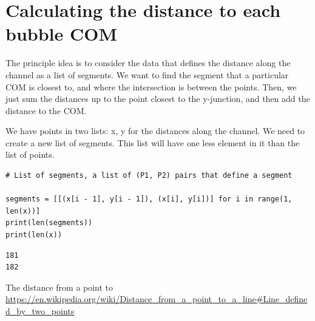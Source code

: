 \documentclass[11pt]{article}
\begin{document}
\section{Calculating the distance to each bubble COM}
\label{sec:orgheadline3}

The principle idea is to consider the data that defines the distance along the channel as a list of segments. We want to find the segment that a particular COM is closest to, and where the intersection is between the points. Then, we just sum the distances up to the point closest to the y-junction, and then add the distance to the COM.

We have points in two lists: x, y for the distances along the channel. We need to create a new list of segments. This list will have one less element in it than the list of points. 

\begin{verbatim}
# List of segments, a list of (P1, P2) pairs that define a segment

segments = [[(x[i - 1], y[i - 1]), (x[i], y[i])] for i in range(1, len(x))]
print(len(segments))
print(len(x))
\end{verbatim}

\begin{verbatim}
181
182
\end{verbatim}


The distance from a point to 
\url{https://en.wikipedia.org/wiki/Distance_from_a_point_to_a_line#Line_defined_by_two_points}
\end{document}
